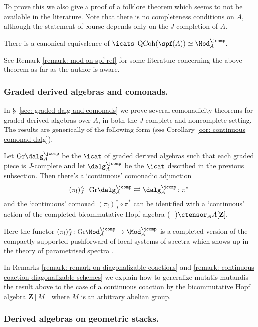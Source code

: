 \documentclass[10pt,reqno]{amsart}
\numberwithin{equation}{section}
\newcommand{\ZZ}{\mathbf{Z}}
\newcommand{\Qcoh}{\mathrm{QCoh}}
\newcommand{\Gr}{\mathrm{Gr}}
\newcommand{\pij}{(\pi_!)^\wedge_J}
\begin{document}
To prove this we also give a proof of a folklore theorem which seems to not be available in the literature. Note that there is no completeness conditions on $A$, although the statement of course depends only on the $J$-completion of $A.$

\begin{theorem}\label{thm: intro spfA is modjcomp}
    There is a canonical equivalence of $\icats$ $\Qcoh(\spf(A))\simeq \Mod_A^\jcomp.$
\end{theorem}

See Remark \ref{remark: mod on spf ref} for some literature concerning the above theorem as far as the author is aware.

\subsubsection{Graded derived algebras and comonads.}

In \S~\ref{sec: graded dalg and comonads} we prove several comonadicity theorems for graded derived algebras over $A$, in both the $J$-complete and noncomplete setting. The results are generically of the following form (see Corollary \ref{cor: continuous comonad dalg}).

\begin{theorem}\label{thm: cts monadicity}
    Let $\Gr\dalg_A^\jcomp$ be the $\icat$ of graded derived algebras such that each graded piece is $J$-complete and let $\dalg_A^\jcomp$ be the $\icat$ described in the previous subsection. Then there's a `continuous' comonadic adjunction $$\pij\colon \Gr\dalg_A^\jcomp\rightleftarrows \dalg_A^\jcomp\colon \pi^*$$ and the `continuous' comonad $\pij\circ \pi^*$ can be identified with a `continuous' action of the completed bicommutative Hopf algebra $(-)\ctensor_A A[\ZZ].$
\end{theorem}

Here the functor $\pij\colon \Gr\Mod_A^\jcomp\to \Mod_A^\jcomp$ is a completed version of the compactly supported pushforward of local systems of spectra which shows up in the theory of parametrised spectra \cite{AndoBlumbergGepner2018ParametrizedThom}. 

In Remarks \ref{remark: remark on diagonalizable coactions} and \ref{remark: continuous coaction diagonalizable schemes} we explain how to generalize mutatis mutandis the result above to the case of a continuous coaction by the bicommutative Hopf algebra $\ZZ[M]$ where $M$ is an arbitrary abelian group.


\subsubsection{Derived algebras on geometric stacks.}
\end{document}
